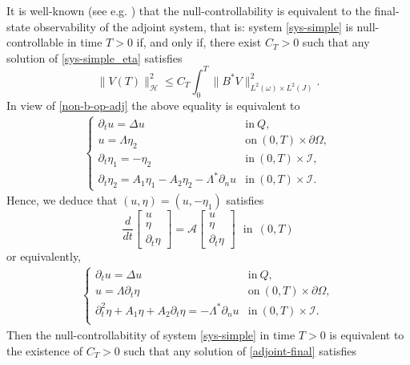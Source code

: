 \documentclass[a4paper, 12pt]{article}
\theoremstyle{plain}
\theoremstyle{definition}
\numberwithin{theorem}{section}
\numberwithin{equation}{section}
\begin{document}
{It is well-known (see e.g. \cite[Theorem 11.2.1, p.357]{Tuc}) that the null-controllability is equivalent to the final-state observability of the adjoint system, that is: system \eqref{sys-simple} is null-controllable in time $T>0$ if, and only if, there exist $C_T>0$ such that any solution of \eqref{sys-simple_eta} satisfies
\begin{equation}\label{obs-form-simple0}
    \|V(T)\|^2_{\mathscr{H}}\leq C_T\int_0^T\|B^* V\|_{L^2(\omega)\times L^2(J)}^2.
\end{equation}
In view of \eqref{non-b-op-adj} the above equality is equivalent to
\begin{align*}
\begin{cases}
\partial_t u =\Delta u &\text{in}~Q,\\
u=\Lambda \eta_2  &\text{on}~(0,T) \times\partial\Omega,\\
\partial_{t}\eta_1=-\eta_2 & \text{in}~(0,T) \times\mathcal{I},\\
\partial_{t}\eta_2=A_1\eta_1-A_2\eta_2-\Lambda^*\partial_n u & \text{in}~(0,T) \times\mathcal{I}.
\end{cases}
\end{align*}
Hence, we deduce that $(u, \eta)=(u,-\eta_1)$ satisfies
\begin{equation}\label{sys-simple_eta-ode}
\frac{d}{dt}\begin{bmatrix}
    u\\
    \eta\\
    \partial_t\eta
\end{bmatrix}=\mathcal{A}\begin{bmatrix}
    u\\
    \eta\\
    \partial_t\eta
\end{bmatrix}~~~\text{in}~~(0,T)
\end{equation}
 or equivalently,
\begin{align}\label{adjoint-final}
\begin{cases}
\partial_t u =\Delta u &\text{in}~Q,\\
u=\Lambda \partial_t\eta  &\text{on}~(0,T) \times\partial\Omega,\\
\partial_{t}^2\eta+A_1\eta+A_2\partial_t \eta=-\Lambda^*\partial_n u & \text{in}~(0,T) \times\mathcal{I}.\\
\end{cases}
\end{align}
Then the null-controllabitity of system \eqref{sys-simple} in time $T>0$ is equivalent to the existence of $C_T>0$ such that any solution of \eqref{adjoint-final} satisfies

}
\end{document}
